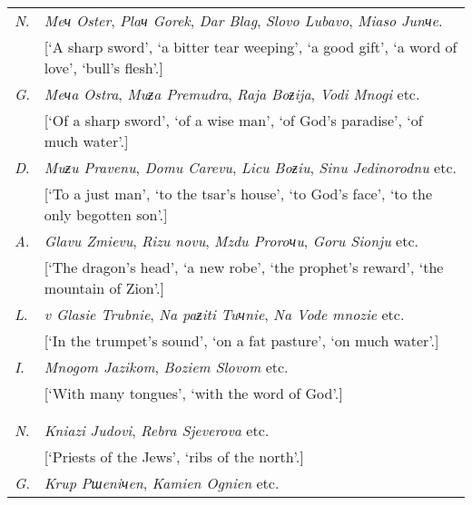 \begin{footnotesize}
\begin{longtable}{ l l }
    \lsptoprule
    \multicolumn{2}{ c }{Singular.} \\
    \midrule
    \textit{N}. & \textit{Meч Oster}, \textit{Plaч Gorek}, \textit{Dar Blag}, \textit{Slovo Lubavo}, \textit{Miaso Junчe}. \\
    & \hspace{0.5cm} [‘A sharp sword’, ‘a bitter tear weeping’, ‘a good gift’, ‘a word of love’, ‘bull’s flesh’.] \\
    \textit{G}. & \textit{Meчa Ostra}, \textit{Muƶa Premudra}, \textit{Raja Boƶija}, \textit{Vodi Mnogi} etc. \\
    & \hspace{0.5cm}[‘Of a sharp sword’, ‘of a wise man’, ‘of God’s paradise’, ‘of much water’.] \\
    \textit{D}. & \textit{Muƶu Pravenu}, \textit{Domu Carevu}, \textit{Licu Boƶiu}, \textit{Sinu Jedinorodnu} etc. \\
    & \hspace{0.5cm} [‘To a just man’, ‘to the tsar’s house’, ‘to God’s face’, ‘to the only begotten son’.] \\
    \textit{A}. & \textit{Glavu Zmievu}, \textit{Rizu novu}, \textit{Mzdu Proroчu}, \textit{Goru Sionju} etc. \\
    & \hspace{0.5cm} [‘The dragon’s head’, ‘a new robe’, ‘the prophet’s reward’, ‘the mountain of Zion’.] \\
    \textit{L}. & \textit{v Glasie Trubnie}, \textit{Na paƶiti Tuчnie}, \textit{Na Vode mnozie} etc. \\
    & \hspace{0.5cm} [‘In the trumpet’s sound’, ‘on a fat pasture’, ‘on much water’.] \\
    \textit{I}. & \textit{Mnogom Jazikom}, \textit{Boziem Slovom} etc. \\
    & \hspace{0.5cm} [‘With many tongues’, ‘with the word of God’.] \\
    \lspbottomrule
    \\
    \lsptoprule
    \multicolumn{2}{ c }{Plural.} \\
    \midrule
    \textit{N}. & \textit{Kniazi Judovi}, \textit{Rebra Sjeverova} etc. \\
    & [‘Priests of the Jews’, ‘ribs of the north’.] \\
    \textit{G}. & \textit{Krup Pшeniчen}, \textit{Kamien Ognien} etc. \\

\end{longtable}
\end{footnotesize}
